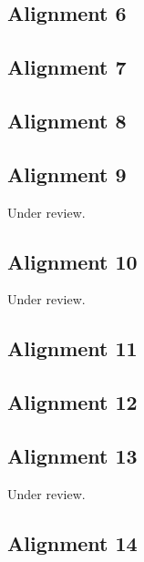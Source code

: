 \documentclass{scrartcl}
\begin{document}
\subsection{Alignment 6} %
\label{sec:align_6}
\clearpage

\subsection{Alignment 7} %
\label{sec:align_7}
\clearpage

\subsection{Alignment 8} %
\label{sec:align_8}
\clearpage

\subsection{Alignment 9} %
\label{sec:align_9}
Under review.%
\clearpage

\subsection{Alignment 10} %
\label{sec:align_10}
Under review.%
\clearpage

\subsection{Alignment 11} %
\label{sec:align_11}
\clearpage

\subsection{Alignment 12} %
\label{sec:align_12}
\clearpage

\subsection{Alignment 13} %
\label{sec:align_13}
Under review.%
\clearpage

\subsection{Alignment 14} %
\label{sec:align_14}
\clearpage
\end{document}
